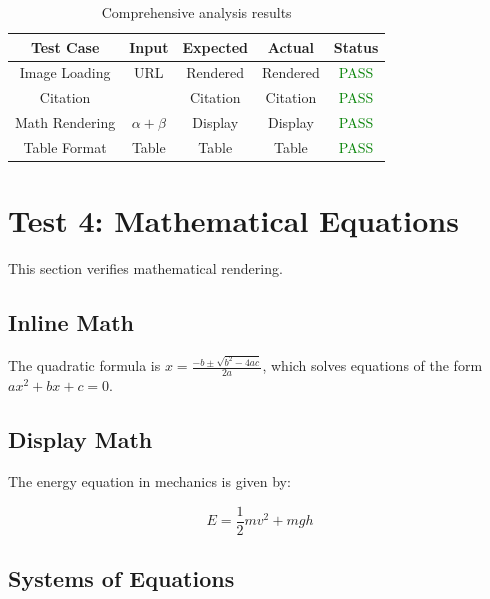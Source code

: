 \documentclass[12pt]{article}
\begin{document}
\begin{table}[ht]
    \centering
    \caption{Comprehensive analysis results}
    \label{tab:analysis}
    \begin{tabular}{|c|c|c|c|c|}
        \hline
        \textbf{Test Case} & \textbf{Input} & \textbf{Expected} & \textbf{Actual} & \textbf{Status} \\
        \hline
        Image Loading & URL & Rendered & Rendered & \textcolor{green}{PASS} \\
        \hline
        Citation & \cite{smith2020} & Citation & Citation & \textcolor{green}{PASS} \\
        \hline
        Math Rendering & $\alpha + \beta$ & Display & Display & \textcolor{green}{PASS} \\
        \hline
        Table Format & Table & Table & Table & \textcolor{green}{PASS} \\
        \hline
    \end{tabular}
\end{table}

\newpage

\section{Test 4: Mathematical Equations}

This section verifies mathematical rendering.

\subsection{Inline Math}

The quadratic formula is $x = \frac{-b \pm \sqrt{b^2 - 4ac}}{2a}$, which solves equations of the form $ax^2 + bx + c = 0$.

\subsection{Display Math}

The energy equation in mechanics is given by:

\begin{equation}
    E = \frac{1}{2}mv^2 + mgh
    \label{eq:energy}
\end{equation}

\subsection{Systems of Equations}
\end{document}

